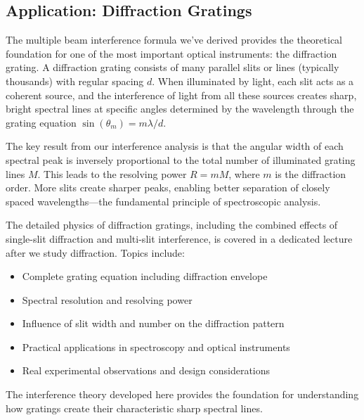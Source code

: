 \documentclass[
  a4paper,
]{book}
\providecommand{\tightlist}{%
  \setlength{\itemsep}{0pt}\setlength{\parskip}{0pt}}
\begin{document}
\subsection{Application: Diffraction
Gratings}\label{application-diffraction-gratings}

The multiple beam interference formula we've derived provides the
theoretical foundation for one of the most important optical
instruments: the diffraction grating. A diffraction grating consists of
many parallel slits or lines (typically thousands) with regular spacing
\(d\). When illuminated by light, each slit acts as a coherent source,
and the interference of light from all these sources creates sharp,
bright spectral lines at specific angles determined by the wavelength
through the grating equation \(\sin(\theta_m) = m\lambda/d\).

The key result from our interference analysis is that the angular width
of each spectral peak is inversely proportional to the total number of
illuminated grating lines \(M\). This leads to the resolving power
\(R = mM\), where \(m\) is the diffraction order. More slits create
sharper peaks, enabling better separation of closely spaced
wavelengths---the fundamental principle of spectroscopic analysis.

\begin{tcolorbox}[enhanced jigsaw, breakable, toptitle=1mm, bottomrule=.15mm, colbacktitle=quarto-callout-note-color!10!white, title=\textcolor{quarto-callout-note-color}{\faInfo}\hspace{0.5em}{Further Study: Diffraction Gratings}, arc=.35mm, rightrule=.15mm, bottomtitle=1mm, opacityback=0, toprule=.15mm, coltitle=black, leftrule=.75mm, opacitybacktitle=0.6, colback=white, left=2mm, titlerule=0mm, colframe=quarto-callout-note-color-frame]

The detailed physics of diffraction gratings, including the combined
effects of single-slit diffraction and multi-slit interference, is
covered in a dedicated lecture after we study diffraction. Topics
include:

\begin{itemize}
\tightlist
\item
  Complete grating equation including diffraction envelope
\item
  Spectral resolution and resolving power
\item
  Influence of slit width and number on the diffraction pattern
\item
  Practical applications in spectroscopy and optical instruments
\item
  Real experimental observations and design considerations
\end{itemize}

The interference theory developed here provides the foundation for
understanding how gratings create their characteristic sharp spectral
lines.

\end{tcolorbox}
\end{document}
